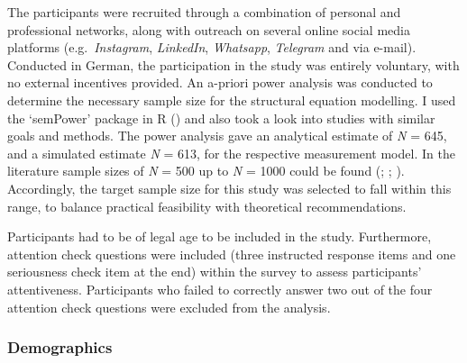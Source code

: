 \documentclass[
  12pt,
  a4paper,
  twoside]{article}
\begin{document}
The participants were recruited through a combination of personal and professional networks, along with outreach on several online social media platforms (e.g.~\emph{Instagram}, \emph{LinkedIn}, \emph{Whatsapp}, \emph{Telegram} and via e-mail). Conducted in German, the participation in the study was entirely voluntary, with no external incentives provided. An a-priori power analysis was conducted to determine the necessary sample size for the structural equation modelling. I used the `semPower' package in R () and also took a look into studies with similar goals and methods.
The power analysis gave an analytical estimate of \emph{N} = 645, and a simulated estimate \emph{N} = 613, for the respective measurement model.
In the literature sample sizes of \emph{N} = 500 up to \emph{N} = 1000 could be found (; ; ).
Accordingly, the target sample size for this study was selected to fall within this range, to balance practical feasibility with theoretical recommendations.

Participants had to be of legal age to be included in the study. Furthermore, attention check questions were included (three instructed response items and one seriousness check item at the end) within the survey to assess participants' attentiveness. Participants who failed to correctly answer two out of the four attention check questions were excluded from the analysis.

\subsubsection{Demographics}\label{demographics}
\end{document}
